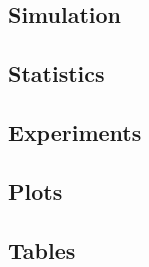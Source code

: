 
\subsection{Simulation}
	
	

\subsection{Statistics}
	
	
	

\subsection{Experiments}
	
	

\subsection{Plots}
	
	
	
	
	

\subsection{Tables}
	
	
